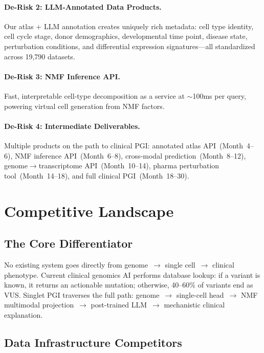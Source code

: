 \documentclass[10pt,twocolumn,letterpaper]{article}
\begin{document}
\paragraph{De-Risk 2: LLM-Annotated Data Products.} Our atlas + LLM annotation
creates uniquely rich metadata: cell type identity, cell cycle stage, donor
demographics, developmental time point, disease state, perturbation conditions,
and differential expression signatures---all standardized across 19,790 datasets.

\paragraph{De-Risk 3: NMF Inference API.} Fast, interpretable cell-type
decomposition as a service at $\sim$100ms per query, powering virtual cell
generation from NMF factors.

\paragraph{De-Risk 4: Intermediate Deliverables.} Multiple products on the path
to clinical PGI: annotated atlas API~(Month~4--6), NMF inference API~(Month~6--8),
cross-modal prediction~(Month~8--12), genome$\to$transcriptome API~(Month~10--14),
pharma perturbation tool~(Month~14--18), and full clinical PGI~(Month~18--30).

\section{Competitive Landscape}
\label{sec:competition}

\subsection{The Core Differentiator}

No existing system goes directly from genome~$\to$ single cell~$\to$ clinical
phenotype. Current clinical genomics AI performs database lookup: if a variant is
known, it returns an actionable mutation; otherwise, 40--60\% of variants end as
VUS. Singlet PGI traverses the full path: genome~$\to$ single-cell head~$\to$
NMF multimodal projection~$\to$ post-trained LLM~$\to$ mechanistic clinical
explanation.

\subsection{Data Infrastructure Competitors}
\end{document}
